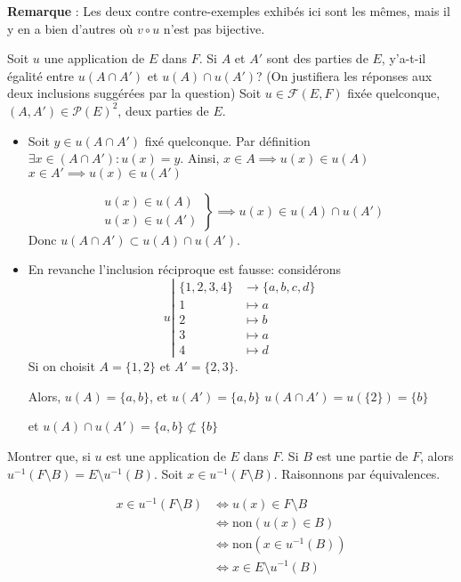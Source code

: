 \documentclass{article}
\begin{document}
\textbf{Remarque} : Les deux contre contre-exemples exhibés ici sont les mêmes, mais il y en a bien d'autres où $v \circ u$ n'est pas bijective.

\begin{question_kholle}{Soit $u$ une application de $E$ dans $F$. Si $A$ et $A'$ sont des parties de $E$, y'a-t-il égalité entre $u(A \cap A')$ et $u(A) \cap u(A')$? (On justifiera les réponses aux deux inclusions suggérées par la question)}
    Soit $u \in \mathcal{F}(E, F)$ fixée quelconque, $(A, A') \in \mathcal{P}(E)^{2}$, deux parties de $E$.
    \begin{itemize}[label=$\lozenge$]
        \item Soit $y \in u(A \cap A')$ fixé quelconque.
        Par définition $\exists x \in (A \cap A') : u(x) = y$.
        Ainsi, $x \in A \implies u(x) \in u(A)$
        $x \in A' \implies u(x) \in u(A')$
        
        $$
        \left.
        \begin{array}{ll}
            u(x) \in u(A) \\
            u(x) \in u(A')
        \end{array}\right\} \implies u(x) \in u(A) \cap u(A')
        $$
        Donc $u(A \cap A') \subset u(A) \cap u(A')$.
        
        \item En revanche l'inclusion réciproque est fausse: considérons
        $$
        u \left|\begin{array}{ll} \{ 1, 2, 3, 4 \} &\to \{ a, b, c, d \} \\ 1 &\mapsto a \\
            2  & \mapsto b  \\
            3  & \mapsto a \\
            4  & \mapsto d\end{array}\right.
            $$
            Si on choisit $A = \{ 1, 2 \}$ et $A' = \{ 2, 3 \}$.
            
            Alors, $u(A) = \{ a, b \}$, et $u(A') = \{ a, b \}$
            $u(A \cap A') = u(\{ 2 \}) = \{ b \}$
            
            et $u(A) \cap u(A') = \{ a, b \} \not\subset \{  b \}$
        \end{itemize}
    \end{question_kholle}
    \begin{question_kholle}{Montrer que, si $u$ est une application de $E$ dans $F$. Si $B$ est une partie de $F$, alors $u^{-1}(F\setminus B) = E \setminus u^{-1}(B)$.}
        Soit $x \in u^{-1}(F\setminus B)$. Raisonnons par équivalences. 
        
        \begin{align*}
            x \in u^{-1}(F \setminus B) 
            & \iff u(x) \in F \setminus B \\
            & \iff \mathrm{non} (u(x) \in B) \\
            & \iff \mathrm{non} (x \in u^{-1}(B)) \\
            & \iff x \in E \setminus u^{-1}(B)
        \end{align*}
        
    \end{question_kholle}
\end{document}
